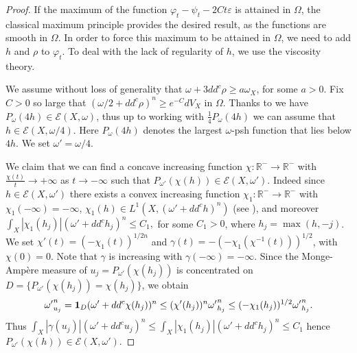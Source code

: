 \documentclass[11pt]{amsart}
\numberwithin{equation}{section}
\begin{document}
\begin{proof}
If the maximum of the function $\varphi_t-\psi_t-2Ct\varepsilon$ is attained in $\Omega$,  the classical maximum principle provides the desired result, as the functions are smooth in $\Omega$. In order to force this maximum to be attained in $\Omega$, we need to add $h$ and $\rho$ to $\varphi_t$.  To deal with 
the lack of regularity of $h$, we use the  viscosity theory.  

 
We assume without loss of generality that $\omega +3dd^c \rho\geq a\omega_X$, for some $a>0$. Fix $C>0$ so large that $(\omega/2+dd^c \rho)^n \geq e^{-C}dV_X$ in $\Omega$. 
Thanks to \cite[Proposition 2.5]{ALS24} we have $P_\omega (4h)\in \mathcal{E}(X,\omega)$,
thus up to working with $\frac{1}{4}P_\omega (4h) $ we can assume that $h\in \mathcal{E}(X, \omega/4)$. Here $P_\omega (4h)$ denotes the largest $\omega$-psh function that lies below $4h$. 
We set $\omega'=\omega/4$.



We claim that we can find a concave increasing function $\chi : \mathbb R^- \rightarrow \mathbb R^-$ with 
$\frac{\chi(t)}{t} \to +\infty$ as $t\to -\infty$ such that $P_{\omega'}(\chi(h)) \in \mathcal{E}(X,\omega')$.
Indeed since $h \in {\mathcal E}(X,\omega')$ there exists a convex increasing function 
$\chi_1: \mathbb R^- \rightarrow \mathbb R^-$ with $\chi_1(-\infty)=-\infty$, $\chi_1(h)\in L^1(X,(\omega'+dd^c h)^n)$
(see \cite[Proposition 2.2]{GZ07}), and moreover
$
\int_X |\chi_1(h_j)| (\omega' +dd^c h_j)^n \leq C_1,
$
for some  $C_1>0$, where $h_j=\max(h,-j)$. 
We set $\chi'(t)=(-\chi_1(t))^{1/2n}$ and $\gamma(t)= -(-\chi_1(\chi^{-1}(t)))^{1/2}$,
with $\chi(0)=0$. Note that $\gamma$ is  increasing  with $\gamma(-\infty)=-\infty$. 
Since the Monge-Amp\`ere measure of $u_j= P_{\omega' }(\chi(h_j))$ is concentrated on 
 $D=\{P_{\omega'}(\chi(h_j))= \chi(h_j)\}$, we obtain
$$
{\omega'}_{u_j}^n = {\bf 1}_D (\omega'+dd^c \chi(h_j))^n 
\leq  (\chi'(h_j))^n {\omega'}_{h_j}^n \leq (-\chi_1(h_j))^{1/2}  {\omega'}_{h_j}^n.
$$ 
Thus 
$
 \int_X |\gamma(u_j)|(\omega'+dd^c u_j)^n \leq \int_X |\chi_1(h_j)| (\omega' +dd^c h_j)^n \leq C_1
$
hence $P_{\omega'}( \chi(h)) \in \mathcal{E} (X, \omega')$.

\smallskip



\end{proof}
\end{document}
